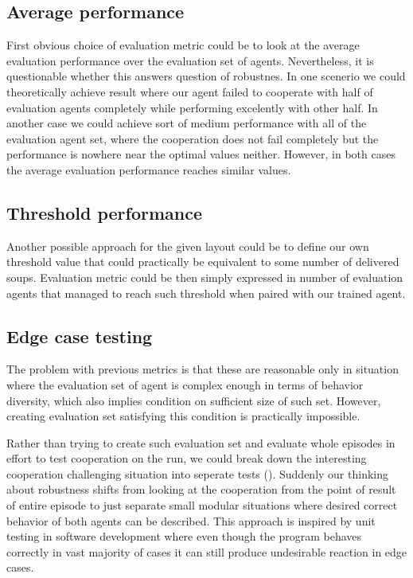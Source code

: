 \subsection{Average performance}

First obvious choice of evaluation metric could be to look at the average evaluation performance over the evaluation set of agents.
Nevertheless, it is questionable whether this answers question of robustnes.
In one scenerio we could theoretically achieve result where our agent failed to cooperate with half of evaluation agents completely while performing excelently with other half.
In another case we could achieve sort of medium performance with all of the evaluation agent set, where the cooperation does not fail completely but the performance is nowhere near the optimal values neither.
However, in both cases the average evaluation performance reaches similar values.  

\subsection{Threshold performance}

Another possible approach for the given layout could be to define our own threshold value that could practically be equivalent to some number of delivered soups.
Evaluation metric could be then simply expressed in number of evaluation agents that managed to reach such threshold when paired with our trained agent.

\subsection{Edge case testing}
The problem with previous metrics is that these are reasonable only in situation where the evaluation set of agent is complex enough in terms of behavior diversity, which also implies condition on sufficient size of such set. 
However, creating evaluation set satisfying this condition is practically impossible.

Rather than trying to create such evaluation set and evaluate whole episodes in effort to test cooperation on the run, we could break down the interesting cooperation challenging situation into seperate tests (\cite{knott2021evaluating}).
Suddenly our thinking about robustness shifts from looking at the cooperation from the point of result of entire episode to just separate small modular situations where desired correct behavior of both agents can be described.
This approach is inspired by unit testing in software development where even though the program behaves correctly in vast majority of cases it can still produce undesirable reaction in edge cases.

